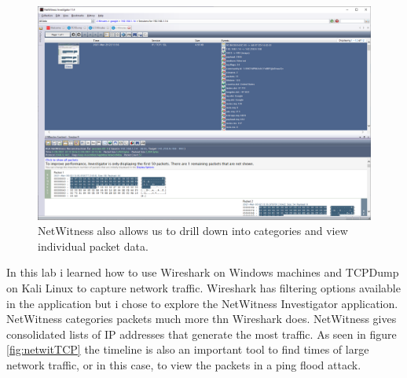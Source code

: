 \begin{figure}[H]
    \centering
    \includegraphics[width=\linewidth]{figures/2minutes_drilldown.png}
    \caption{NetWitness also allows us to drill down into categories and view individual packet data.}
    \label{netwitdrill}
\end{figure}

In this lab i learned how to use Wireshark on Windows machines and TCPDump on Kali Linux to capture network traffic.
Wireshark has filtering options available in the application but i chose to explore the NetWitness Investigator application.
NetWitness categories packets much more thn Wireshark does.
NetWitness gives consolidated lists of IP addresses that generate the most traffic.
As seen in figure \ref{fig:netwitTCP} the timeline is also an important tool to find times of large network traffic, or in this case, to view the packets in a ping flood attack.
